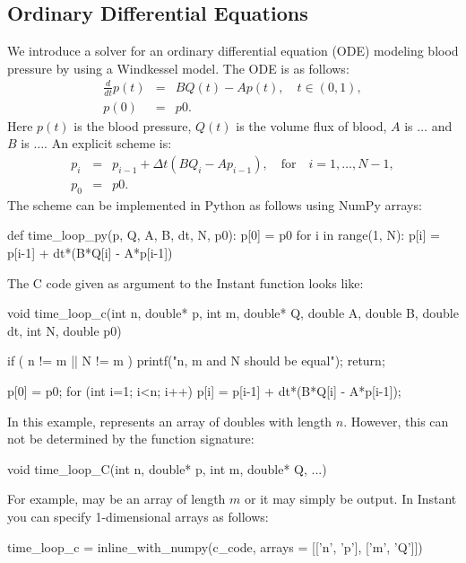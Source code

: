 \subsection{Ordinary Differential Equations}
We introduce a
solver for an ordinary differential equation (ODE) modeling blood pressure by
using a Windkessel model. The ODE is as follows:
\begin{eqnarray}
\frac{d}{dt}p(t) &=& B Q(t) - A p(t), \quad t \in (0,1), \\ 
p(0) &=& p0.   
\end{eqnarray}
Here $p(t)$ is the blood pressure, $Q(t)$ is the volume flux of blood,  
$A$ is $\ldots$ and $B$ is $\ldots$.  
An explicit scheme is:
\begin{eqnarray}
p_i &=& p_{i-1} + \Delta t (B Q_i - A p_{i-1}), \quad \mbox{for}\quad i=1,\ldots,N-1,  \\ 
p_0 &=& p0.
\end{eqnarray}
The scheme can be implemented in Python as follows using NumPy arrays:
\begin{code}
def time_loop_py(p, Q, A, B, dt, N, p0): 
    p[0] = p0 
    for i in range(1, N): 
        p[i] = p[i-1] + dt*(B*Q[i] - A*p[i-1])
\end{code}
The C code given as argument to the Instant function 
looks like:
\begin{code}
void time_loop_c(int n, double* p,
                 int m, double* Q,
                 double A, double B,
                 double dt, int N, double p0)
{
    if ( n != m || N != m )
    {
        printf("n, m and N should be equal\n");
        return;
    }

    p[0] = p0;
    for (int i=1; i<n; i++)
    {
        p[i] = p[i-1] + dt*(B*Q[i] - A*p[i-1]);
    }
}
\end{code}
In this example,  represents an array of doubles with
length $n$. However, this can not be determined by the function signature:
\begin{code}
void time_loop_C(int n, double* p, int m, double* Q, ...) 
\end{code}
For example,  may be an array of length $m$ or it may simply be
output. In Instant
you can specify 1-dimensional arrays as follows:
\begin{code}
time_loop_c = inline_with_numpy(c_code,
                                arrays = [['n', 'p'],
                                          ['m', 'Q']])
\end{code}
